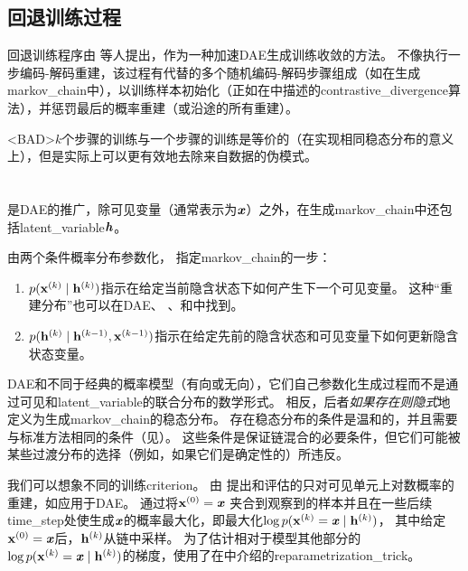 \subsection{回退训练过程}
\label{sec:walk_back_training_procedure}
回退训练程序由\citet{Bengio-et-al-NIPS2013-small} 等人提出，作为一种加速\gls{DAE}生成训练收敛的方法。
不像执行一步编码-解码重建，该过程有代替的多个随机编码-解码步骤组成（如在生成\gls{markov_chain}中），以训练样本初始化（正如在中描述的\gls{contrastive_divergence}算法），并惩罚最后的概率重建（或沿途的所有重建）。

<BAD>$k$个步骤的训练与一个步骤的训练是等价的（在实现相同稳态分布的意义上），但是实际上可以更有效地去除来自数据的伪模式。


\section{}
\label{sec:generative_stochastic_networks}
 \citep{Bengio-et-al-ICML-2014} 是\gls{DAE}的推广，除可见变量（通常表示为$\boldsymbol{\mathit{x}}$）之外，在生成\gls{markov_chain}中还包括\gls{latent_variable}$\boldsymbol{\mathit{h}}$。

由两个条件概率分布参数化， 指定\gls{markov_chain}的一步：
\begin{enumerate}
 \item $p(\mathbf{x}^{(k)}  \mid \mathbf{h}^{(k)} )$指示在给定当前隐含状态下如何产生下一个可见变量。
 这种``重建分布''也可以在\gls{DAE}、 、和中找到。
 \item $p(\mathbf{h}^{(k)}  \mid \mathbf{h}^{(k-1)}, \mathbf{x}^{(k-1)})$指示在给定先前的隐含状态和可见变量下如何更新隐含状态变量。
\end{enumerate}

\gls{DAE}和不同于经典的概率模型（有向或无向），它们自己参数化生成过程而不是通过可见和\gls{latent_variable}的联合分布的数学形式。
相反，后者\emph{如果存在则隐式}地定义为生成\gls{markov_chain}的稳态分布。
存在稳态分布的条件是温和的，并且需要与标准方法相同的条件（见）。
这些条件是保证链混合的必要条件，但它们可能被某些过渡分布的选择（例如，如果它们是确定性的）所违反。


我们可以想象不同的训练\gls{criterion}。
由\citet{Bengio-et-al-ICML-2014} 提出和评估的只对可见单元上对数概率的重建，如应用于\gls{DAE}。
通过将$\mathbf{x}^{(0)} = \boldsymbol{\mathit{x}}$ 夹合到观察到的样本并且在一些后续\gls{time_step}处使生成$\boldsymbol{\mathit{x}}$的概率最大化，即最大化$\log p(\mathbf{x}^{(k)} = \boldsymbol{\mathit{x}}  \mid  \mathbf{h}^{(k)})$， 其中给定$\mathbf{x}^{(0)} = \boldsymbol{\mathit{x}}$后，$\mathbf{h}^{(k)}$从链中采样。
为了估计相对于模型其他部分的$\log p(\mathbf{x}^{(k)} = \boldsymbol{\mathit{x}}  \mid  \mathbf{h}^{(k)})$的梯度，\citet{Bengio-et-al-ICML-2014}使用了在中介绍的\gls{reparametrization_trick}。

